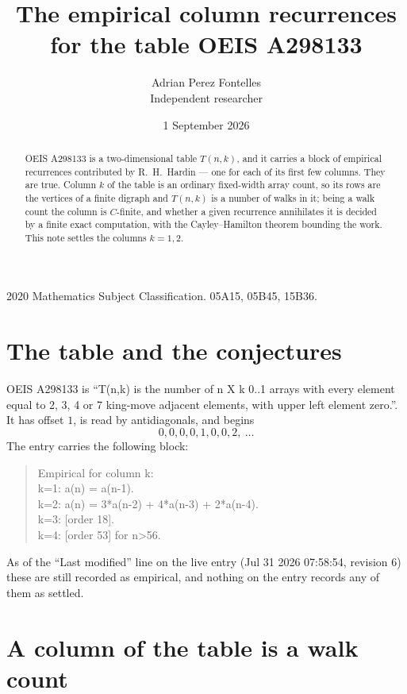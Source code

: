 \documentclass[11pt,a4paper]{article}
\title{The empirical column recurrences for the table OEIS A298133}
\author{Adrian Perez Fontelles\\ \small Independent researcher}
\date{1 September 2026}
\theoremstyle{plain}
\theoremstyle{definition}
\begin{document}
\maketitle

\begin{abstract}
OEIS A298133 is a two-dimensional table $T(n,k)$, and it carries a block of empirical
recurrences contributed by R.~H.~Hardin --- one for each of its first few columns. They are
true. Column $k$ of the table is an ordinary fixed-width array count, so its rows are the
vertices of a finite digraph and $T(n,k)$ is a number of walks in it; being a walk count the
column is $C$-finite, and whether a given recurrence annihilates it is decided by a finite
exact computation, with the Cayley--Hamilton theorem bounding the work. This note settles the columns $k=1, 2$.
\end{abstract}

\noindent\small 2020 Mathematics Subject Classification. 05A15, 05B45, 15B36.\normalsize

\section{The table and the conjectures}

OEIS A298133 is ``T(n,k) is the number of n X k 0..1 arrays with every element equal to 2, 3, 4 or 7 king-move adjacent elements, with upper left element zero.''. It has offset $1$, is
read by antidiagonals, and begins
\[
0, 0, 0, 0, 1, 0, 0, 2,\ \dots
\]
The entry carries the following block:
\begin{quote}\small
Empirical for column k:\\
k=1: a(n) = a(n-1).\\
k=2: a(n) = 3*a(n-2) + 4*a(n-3) + 2*a(n-4).\\
k=3: [order 18].\\
k=4: [order 53] for n>56.\\
\end{quote}
As of the ``Last modified'' line on the live entry (Jul 31 2026 07:58:54, revision 6) these are still
recorded as empirical, and nothing on the entry records any of them as settled.

\section{A column of the table is a walk count}
\end{document}
